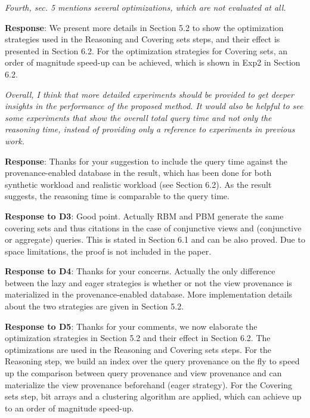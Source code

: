 \begin{appendix}
\textit{Fourth, sec. 5 mentions several optimizations, which are not evaluated at all.}


\textbf{Response}: We present more details in Section 5.2 to show the optimization strategies used in the Reasoning and Covering sets steps, and their effect is presented in Section 6.2. For the optimization strategies for Covering sets, an order of magnitude speed-up can be achieved, which is shown in Exp2 in Section 6.2.


\textit{Overall, I think that more detailed experiments should be provided to get deeper insights in the performance of the proposed method. It would also be helpful to see some experiments that show the overall total query time and not only the reasoning time, instead of providing only a reference to experiments in previous work.}


\textbf{Response}:
Thanks for your suggestion to include the query time against the provenance-enabled database in the result, which has been done for both synthetic workload and realistic workload (see Section 6.2). As the result suggests, the reasoning time is comparable to the query time.



\textbf{Response to D3}:
Good point. Actually RBM and PBM generate the same covering sets and thus citations in the case of conjunctive views and (conjunctive or aggregate) queries.  This is  stated in Section 6.1 and can be also proved. Due to space limitations, the proof is not included in the paper.  


\textbf{Response to D4}:
Thanks for your concerns. Actually the only difference between the lazy and eager strategies is whether or not the view provenance is materialized in the provenance-enabled database. More implementation details about the two strategies are given in Section 5.2. 



\textbf{Response to D5}:
Thanks for your comments, we now elaborate the optimization strategies in Section 5.2 and their effect in Section 6.2. The optimizations are used in the Reasoning and Covering sets steps. For the Reasoning step, we build an index over the query provenance on the fly to speed up the comparison between query provenance and view provenance and can materialize the view provenance beforehand (eager strategy). For the Covering sets step, bit arrays and a clustering algorithm are applied, which can achieve up to an order of magnitude speed-up.



\end{appendix}
